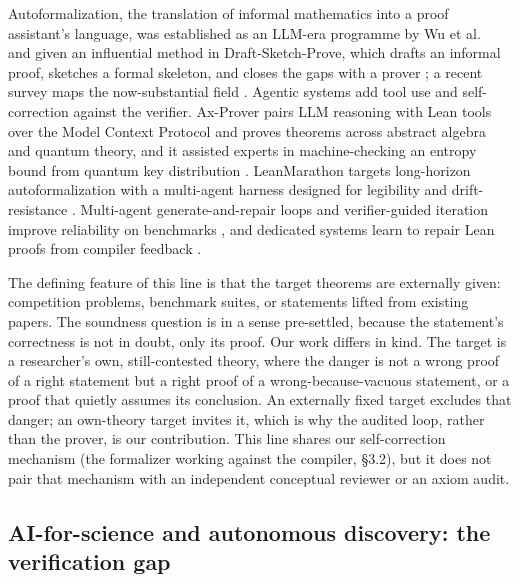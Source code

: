 \documentclass[11pt]{article}
\begin{document}
Autoformalization, the translation of informal mathematics into a proof assistant's language, was
established as an LLM-era programme by Wu et al.\ \cite{r8} and given an influential method in
Draft-Sketch-Prove, which drafts an informal proof, sketches a formal skeleton, and closes the gaps
with a prover \cite{r9}; a recent survey maps the now-substantial field \cite{r10}. Agentic systems
add tool use and self-correction against the verifier. Ax-Prover pairs LLM reasoning with Lean tools
over the Model Context Protocol and proves theorems across abstract algebra and quantum theory, and
it assisted experts in machine-checking an entropy bound from quantum key distribution \cite{r12}.
LeanMarathon targets long-horizon autoformalization with a multi-agent harness designed for
legibility and drift-resistance \cite{r13}. Multi-agent generate-and-repair loops and
verifier-guided iteration improve reliability on benchmarks \cite{r14,r15}, and dedicated systems
learn to repair Lean proofs from compiler feedback \cite{r16}.

The defining feature of this line is that the target theorems are externally given: competition
problems, benchmark suites, or statements lifted from existing papers. The soundness question is in
a sense pre-settled, because the statement's correctness is not in doubt, only its proof. Our work
differs in kind. The target is a researcher's own, still-contested theory, where the danger is not
a wrong proof of a right statement but a right proof of a wrong-because-vacuous statement, or a
proof that quietly assumes its conclusion. An externally fixed target excludes that danger; an
own-theory target invites it, which is why the audited loop, rather than the prover, is our
contribution. This line shares our self-correction mechanism (the formalizer working against the
compiler, \S3.2), but it does not pair that mechanism with an independent conceptual reviewer or an
axiom audit.

\subsection{AI-for-science and autonomous discovery: the verification gap}
\end{document}
